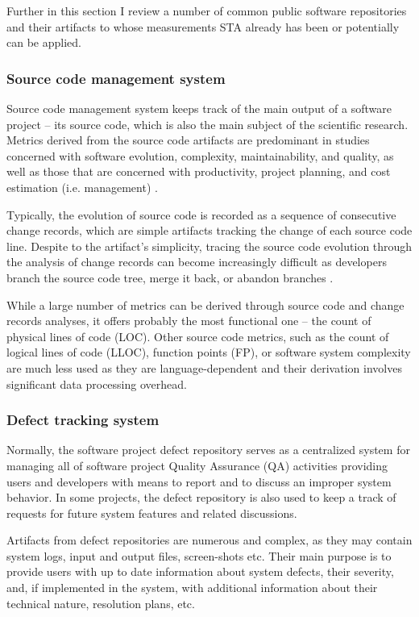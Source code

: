 Further in this section I review a number of common public software repositories and their artifacts to whose measurements 
STA already has been or potentially can be applied. 

\subsubsection{Source code management system}
Source code management system keeps track of the main output of a software project -- its source code, which is also the 
main subject of the scientific research. Metrics derived from the source code artifacts are predominant in studies concerned 
with software evolution, complexity, maintainability, and quality, as well as those that are concerned with productivity, 
project planning, and cost estimation (i.e. management) \cite{citeulike:4534888}. 

Typically, the evolution of source code is recorded as a sequence of consecutive change records, which are simple artifacts
tracking the change of each source code line. Despite to the artifact's simplicity, tracing the source code evolution through 
the analysis of change records can become increasingly difficult as developers branch the source code tree, merge it back, 
or abandon branches \cite{citeulike:13156191}.

While a large number of metrics can be derived through source code and change records analyses, it offers probably 
the most functional one -- the count of physical lines of code (LOC). Other source code metrics, such as the count of logical lines 
of code (LLOC), function points (FP), or software system complexity are much less used as they are language-dependent and their 
derivation involves significant data processing overhead.

\subsubsection{Defect tracking system}
Normally, the software project defect repository serves as a centralized system for managing all of software project 
Quality Assurance (QA) activities providing users and developers with means to report and to discuss an improper system behavior.
In some projects, the defect repository is also used to keep a track of requests for future system features and related
discussions.

Artifacts from defect repositories are numerous and complex, as they may contain system logs, input and output files, 
screen-shots etc. Their main purpose is to provide users with up to date information about system defects, their severity, 
and, if implemented in the system, with additional information about their technical nature, resolution plans, etc.

